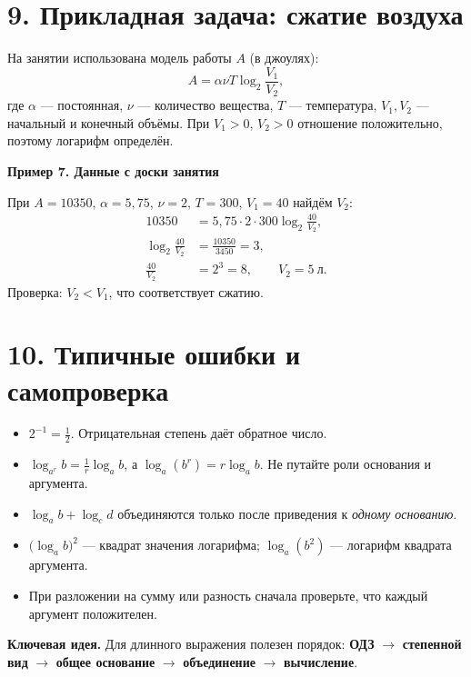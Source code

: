 \documentclass[a4paper,11pt]{article}
\newcommand{\idea}[1]{\par\textcolor{darkaccent}{\textbf{Ключевая идея.}} #1\par}
\newcommand{\namedexample}[1]{\par\medskip\textbf{#1}\par\vspace{-2mm}}
\begin{document}
\section*{9. Прикладная задача: сжатие воздуха}
На занятии использована модель работы \(A\) (в джоулях):
\[
\boxed{A=\alpha\nu T\log_2\frac{V_1}{V_2}},
\]
где \(\alpha\) --- постоянная, \(\nu\) --- количество вещества, \(T\) --- температура, \(V_1,V_2\) --- начальный и конечный объёмы. При \(V_1>0\), \(V_2>0\) отношение положительно, поэтому логарифм определён.

\namedexample{Пример 7. Данные с доски занятия}
При \(A=10350\), \(\alpha=5{,}75\), \(\nu=2\), \(T=300\), \(V_1=40\) найдём \(V_2\):
\[
\begin{aligned}
10350&=5{,}75\cdot2\cdot300\log_2\frac{40}{V_2},\\
\log_2\frac{40}{V_2}&=\frac{10350}{3450}=3,\\
\frac{40}{V_2}&=2^3=8,
\qquad V_2=\boxed{5\ \text{л}}.
\end{aligned}
\]
Проверка: \(V_2<V_1\), что соответствует сжатию.

\section*{10. Типичные ошибки и самопроверка}
\begin{itemize}
\item \(\displaystyle 2^{-1}=\frac12\). Отрицательная степень даёт обратное число.
\item \(\displaystyle \log_{a^r}b=\frac1r\log_a b\), а \(\log_a(b^r)=r\log_a b\). Не путайте роли основания и аргумента.
\item \(\log_a b+\log_c d\) объединяются только после приведения к \emph{одному основанию}.
\item \(\bigl(\log_a b\bigr)^2\) --- квадрат значения логарифма; \(\log_a(b^2)\) --- логарифм квадрата аргумента.
\item При разложении на сумму или разность сначала проверьте, что каждый аргумент положителен.
\end{itemize}

\idea{Для длинного выражения полезен порядок: \textbf{ОДЗ} $\to$ \textbf{степенной вид} $\to$ \textbf{общее основание} $\to$ \textbf{объединение} $\to$ \textbf{вычисление}.}
\end{document}
